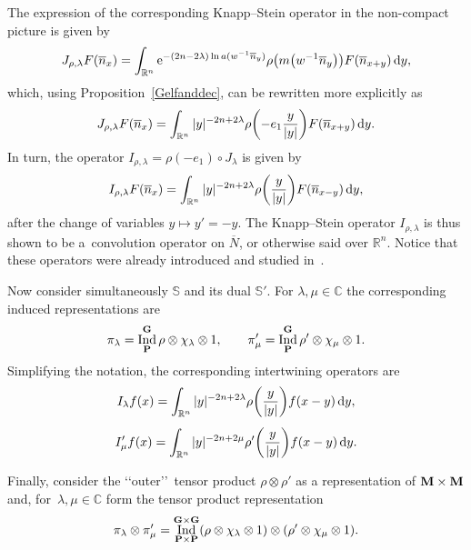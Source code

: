 \documentclass[pdftex]{sigma}
\DeclareMathOperator{\Ind}{Ind}
\numberwithin{equation}{section}
\begin{document}
The expression of the corresponding Knapp--Stein operator in the non-compact picture is given by
\begin{gather*}
J_{ \rho,\lambda} F(\overline n_x) = \int_{\mathbb R^n} {\rm e}^{-( 2n-2\lambda)\ln a(w^{-1} \overline n_y)} \rho\big(m\big(w^{-1} \overline n_y\big)
\big) F(\overline n_{x+y})\,{\rm d}y ,
\end{gather*}
which, using Proposition~\ref{Gelfanddec}, can be rewritten more explicitly as
\begin{gather*}
J_{ \rho,\lambda} F(\overline n_x) = \int_{\mathbb R^n} \vert y\vert^{-2n+2\lambda} \rho\bigg({-}e_1\frac{y}{\vert y\vert}\bigg)F(\overline n_{x+y})\,{\rm d}y .
\end{gather*}
In turn, the operator $I_{\rho, \lambda} = \rho(-e_1)\circ J_\lambda$ is given by
\begin{gather*}\label{KS}
 I_{\rho,\lambda} F( \overline n_x) = \int_{\mathbb R^n} \vert y\vert^{-2n+2\lambda} \rho\bigg(\frac{y}{\vert y \vert}\bigg) F(\overline n_{x-y})\,{\rm d}y ,
\end{gather*}
after the change of variables $y\mapsto y'=-y$. The Knapp--Stein operator $I_{ \rho,\lambda}$ is thus shown to be a~convolution operator on $\overline N$, or otherwise said over $\mathbb R^n$. Notice that these operators were already introduced and studied in~\cite{co}.

Now consider simultaneously $\mathbb S$ and its dual $\mathbb S'$. For $\lambda, \mu \in \mathbb C$ the corresponding induced representations are
\begin{gather*}
\pi_\lambda = \Ind_{\bf P}^{\bf G} \rho\otimes\chi_\lambda\otimes 1, \qquad
\pi'_\mu = \Ind_{\bf P}^{\bf G} \rho'\otimes \chi_\mu\otimes 1 .
\end{gather*}
Simplifying the notation, the corresponding intertwining operators	are
\begin{gather}
I_\lambda f(x) = \int_{\mathbb R^n}\vert y\vert^{-2n+2\lambda}\rho\bigg( \frac{y}{\vert y\vert}\bigg) f(x-y)\,{\rm d}y , \nonumber
\\[1ex]
I_\mu' f(x) = \int_{\mathbb R^n} \vert y\vert^{-2n+2\mu}\rho' \bigg( \frac{y}{\vert y\vert}\bigg)f(x-y)\,{\rm d}y .\label{defKS}
\end{gather}

Finally, consider the \lq\lq outer\rq\rq\ tensor product $\rho\otimes \rho'$ as a representation of $\bf M\times \bf M$ and, for~$\lambda, \mu\in \mathbb C$ form the tensor product representation
\begin{gather*}
\pi_\lambda \otimes \pi'_\mu= \Ind_{\bf P\times \bf P}^{\bf G\times \bf G}(\rho\otimes\chi_\lambda\otimes 1)\otimes (\rho'\otimes \chi_\mu\otimes 1) .
\end{gather*}
\end{document}
